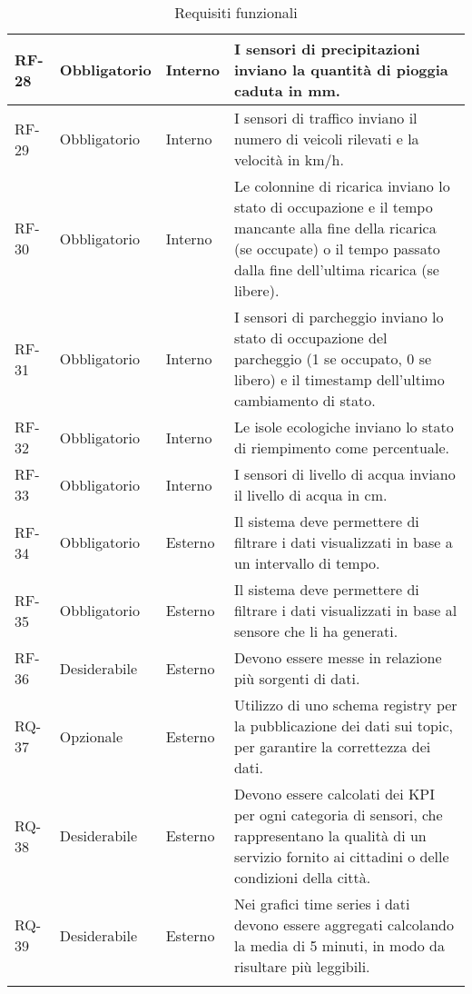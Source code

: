 \begin{longtable}{|>{\centering\arraybackslash}m{}|>{\centering\arraybackslash}m{}|>{\centering\arraybackslash}m{}|>{\centering\arraybackslash}m{}|}
	RF-28           & Obbligatorio        & Interno        & I sensori di precipitazioni inviano la quantità di pioggia caduta in mm.
	\\\hline
	RF-29           & Obbligatorio        & Interno        & I sensori di traffico inviano il numero di veicoli rilevati e la velocità in km/h.
	\\\hline
	RF-30           & Obbligatorio        & Interno        & Le colonnine di ricarica inviano lo stato di occupazione e il tempo mancante alla fine della ricarica (se occupate) o il tempo passato dalla fine dell'ultima ricarica (se libere).
	\\\hline
	RF-31           & Obbligatorio        & Interno        & I sensori di parcheggio inviano lo stato di occupazione del parcheggio (1 se occupato, 0 se libero) e il timestamp dell'ultimo cambiamento di stato.
	\\\hline
	RF-32           & Obbligatorio        & Interno        & Le isole ecologiche inviano lo stato di riempimento come percentuale.
	\\\hline
	RF-33           & Obbligatorio        & Interno        & I sensori di livello di acqua inviano il livello di acqua in cm.
	\\\hline
	RF-34           & Obbligatorio        & Esterno        & Il sistema deve permettere di filtrare i dati visualizzati in base a un intervallo di tempo.
	\\\hline
	RF-35           & Obbligatorio        & Esterno        & Il sistema deve permettere di filtrare i dati visualizzati in base al sensore che li ha generati.
	\\\hline
	RF-36           & Desiderabile        & Esterno        & Devono essere messe in relazione più sorgenti di dati.
	\\\hline
	RQ-37           & Opzionale           & Esterno        & Utilizzo di uno schema registry per la pubblicazione dei dati sui topic, per garantire la correttezza dei dati.
	\\\hline
	RQ-38           & Desiderabile        & Esterno        & Devono essere calcolati dei KPI per ogni categoria di sensori, che rappresentano la qualità di un servizio fornito ai cittadini o delle condizioni della città.
	\\\hline
	RQ-39           & Desiderabile        & Esterno        & Nei grafici time series i dati devono essere aggregati calcolando la media di 5 minuti, in modo da risultare più leggibili.
	\\\hline
	\caption{Requisiti funzionali}
\end{longtable}

